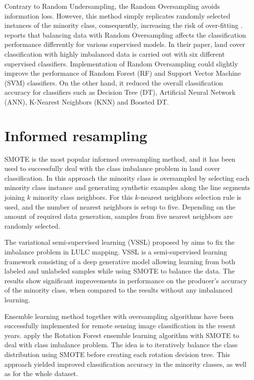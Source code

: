 \documentclass[remotesensing,article,submit,moreauthors,pdftex]{Definitions/mdpi}
\begin{document}
Contrary to Random Undersampling, the Random Oversampling avoids information
loss. However, this method simply replicates randomly selected instances of the
minority class, consequently, increasing the risk of over-fitting
\cite{Krawczyk2016}. \cite{Maxwell2018} reports that balancing data with Random
Oversampling affects the classification performance differently for various
supervised models. In their paper, land cover classification with highly
imbalanced data is carried out with six different supervised classifiers.
Implementation of Random Oversampling could slightly improve the performance of
Random Forest (RF) and Support Vector Machine (SVM) classifiers. On the other
hand, it reduced the overall classification accuracy for classifiers such as
Decision Tree (DT), Artificial Neural Network (ANN), K-Nearest Neighbors (KNN)
and Boosted DT.

\section{Informed resampling}

SMOTE is the most popular informed oversampling method, and it has been used to
successfully deal with the class imbalance problem in land cover classification.
In this approach the minority class is oversampled by selecting each minority 
class instance and generating synthetic examples along the line segments 
joining $k$ minority class neighbors. For this $k$-nearest neighbors selection 
rule is used, and the number of nearest neighbors is setup to five. Depending 
on the amount of required data generation, samples from five nearest 
neighbors are randomly selected.

The variational semi-supervised learning (VSSL) proposed by \cite{Cenggoro2018}
aims to fix the imbalance problem in LULC mapping. VSSL is a semi-supervised
learning framework consisting of a deep generative model allowing learning from
both labeled and unlabeled samples while using SMOTE to balance the data. The
results show significant improvements in performance on the producer’s accuracy
of the minority class, when compared to the results without any imbalanced
learning.

Ensemble learning method together with oversampling algorithms have been
successfully implemented for remote sensing image classification in the resent
years. \cite{Feng2018, Feng2019} apply the Rotation Forest ensemble learning
algorithm with SMOTE to deal with class imbalance problem. The idea is to
iteratively balance the class distribution using SMOTE before creating each
rotation decision tree. This approach yielded improved classification accuracy
in the minority classes, as well as for the whole dataset.
\end{document}
